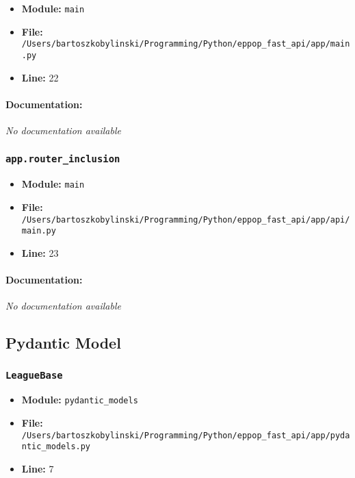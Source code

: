 \documentclass[11pt,a4paper]{article}
\begin{document}
\begin{itemize}
    \item \textbf{Module:} \texttt{main}
    \item \textbf{File:} \texttt{/Users/bartoszkobylinski/Programming/Python/eppop\_fast\_api/app/main.py}
    \item \textbf{Line:} 22
\end{itemize}

\paragraph{Documentation:} \textit{No documentation available}


\vspace{1em}
\subsubsection{\texttt{app.router\_inclusion}}

\begin{itemize}
    \item \textbf{Module:} \texttt{main}
    \item \textbf{File:} \texttt{/Users/bartoszkobylinski/Programming/Python/eppop\_fast\_api/app/api/main.py}
    \item \textbf{Line:} 23
\end{itemize}

\paragraph{Documentation:} \textit{No documentation available}


\vspace{1em}
\subsection{Pydantic Model}

\subsubsection{\texttt{LeagueBase}}

\begin{itemize}
    \item \textbf{Module:} \texttt{pydantic\_models}
    \item \textbf{File:} \texttt{/Users/bartoszkobylinski/Programming/Python/eppop\_fast\_api/app/pydantic\_models.py}
    \item \textbf{Line:} 7
\end{itemize}
\end{document}
